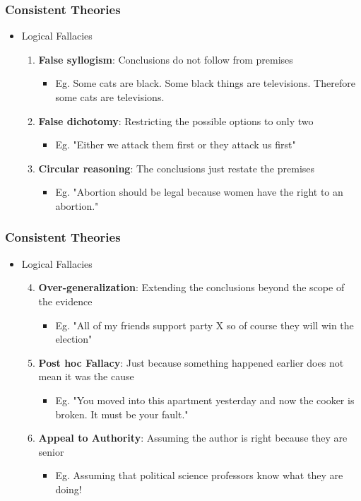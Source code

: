 \documentclass[xcolor=x11names,compress]{beamer}\usepackage[]{graphicx}\usepackage[]{color}
\renewcommand{\(}{\begin{columns}}
\renewcommand{\)}{\end{columns}}
\newcommand{\<}[1]{\begin{column}{#1}}
\renewcommand{\>}{\end{column}}
\begin{document}
\begin{frame}
\frametitle{Consistent Theories}
\begin{itemize}
\item Logical Fallacies
\pause
\begin{enumerate}
\item \textbf{False syllogism}: Conclusions do not follow from premises
\begin{itemize}
\item Eg. Some cats are black. Some black things are televisions. Therefore some cats are televisions.
\pause
\end{itemize}
\item \textbf{False dichotomy}: Restricting the possible options to only two
\begin{itemize}
\item Eg. "Either we attack them first or they attack us first"
\pause
\end{itemize}
\item \textbf{Circular reasoning}: The conclusions just restate the premises
\begin{itemize}
\item Eg. "Abortion should be legal because women have the right to an abortion."
\end{itemize}
\end{enumerate}
\end{itemize}
\end{frame}

\begin{frame}
\frametitle{Consistent Theories}
\begin{itemize}
\item Logical Fallacies
\pause
\begin{enumerate}
\setcounter{enumi}{3}
\item \textbf{Over-generalization}: Extending the conclusions beyond the scope of the evidence
\begin{itemize}
\item Eg. "All of my friends support party X so of course they will win the election"
\pause
\end{itemize}
\item \textbf{Post hoc Fallacy}: Just because something happened earlier does not mean it was the cause
\begin{itemize}
\item Eg. "You moved into this apartment yesterday and now the cooker is broken. It must be your fault."
\pause
\end{itemize}
\item \textbf{Appeal to Authority}: Assuming the author is right because they are senior
\begin{itemize}
\item Eg. Assuming that political science professors know what they are doing!
\end{itemize}
\end{enumerate}
\end{itemize}
\end{frame}
\end{document}
